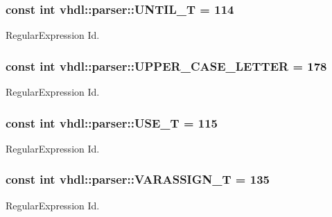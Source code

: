 \subsubsection[{U\+N\+T\+I\+L\+\_\+\+T}]{\setlength{\rightskip}{0pt plus 5cm}const int vhdl\+::parser\+::\+U\+N\+T\+I\+L\+\_\+\+T = 114}\label{namespacevhdl_1_1parser_a095564f2876a826044035b58ea856640}
Regular\+Expression Id. \hypertarget{namespacevhdl_1_1parser_a2c72a10e0b57676bdedb59ea1afd615d}{}
\subsubsection[{U\+P\+P\+E\+R\+\_\+\+C\+A\+S\+E\+\_\+\+L\+E\+T\+T\+E\+R}]{\setlength{\rightskip}{0pt plus 5cm}const int vhdl\+::parser\+::\+U\+P\+P\+E\+R\+\_\+\+C\+A\+S\+E\+\_\+\+L\+E\+T\+T\+E\+R = 178}\label{namespacevhdl_1_1parser_a2c72a10e0b57676bdedb59ea1afd615d}
Regular\+Expression Id. \hypertarget{namespacevhdl_1_1parser_a065329ede7033404f78ef719adaabaed}{}
\subsubsection[{U\+S\+E\+\_\+\+T}]{\setlength{\rightskip}{0pt plus 5cm}const int vhdl\+::parser\+::\+U\+S\+E\+\_\+\+T = 115}\label{namespacevhdl_1_1parser_a065329ede7033404f78ef719adaabaed}
Regular\+Expression Id. \hypertarget{namespacevhdl_1_1parser_a8dd0537fa05e3186e643340b9db4d459}{}
\subsubsection[{V\+A\+R\+A\+S\+S\+I\+G\+N\+\_\+\+T}]{\setlength{\rightskip}{0pt plus 5cm}const int vhdl\+::parser\+::\+V\+A\+R\+A\+S\+S\+I\+G\+N\+\_\+\+T = 135}\label{namespacevhdl_1_1parser_a8dd0537fa05e3186e643340b9db4d459}
Regular\+Expression Id. \hypertarget{namespacevhdl_1_1parser_aaeb31d756ecb51f6481da6f3f91d6f6e}{}
